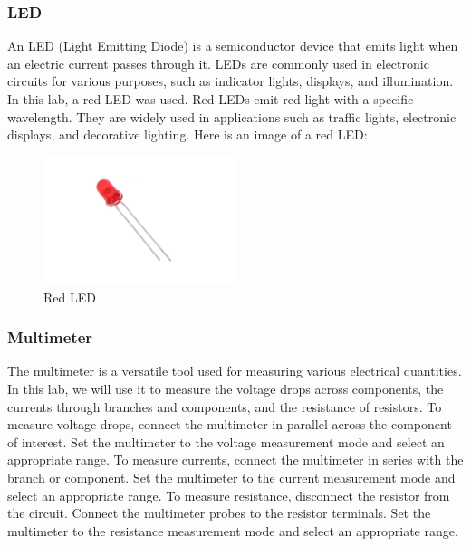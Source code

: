 \documentclass[a4paper, 10pt]{article}
\begin{document}
			\subsubsection{LED}
				An LED (Light Emitting Diode) is a semiconductor device that emits light when an electric current passes through it. LEDs are commonly used in electronic circuits for various purposes, such as indicator lights, displays, and illumination.
				In this lab, a red LED was used. Red LEDs emit red light with a specific wavelength. They are widely used in applications such as traffic lights, electronic displays, and decorative lighting.
				Here is an image of a red LED:

				\begin{figure}[h!]
					\centering
					\includegraphics[width = 0.5\textwidth]{images/LED.jpeg}
					\caption{Red LED}
					\label{fig:red_led}
				\end{figure}

			\pagebreak

			\subsubsection{Multimeter}
				The multimeter is a versatile tool used for measuring various electrical quantities. In this lab, we will use it to measure the voltage drops across components, the currents through branches and components, and the resistance of resistors.
				To measure voltage drops, connect the multimeter in parallel across the component of interest. Set the multimeter to the voltage measurement mode and select an appropriate range.
				To measure currents, connect the multimeter in series with the branch or component. Set the multimeter to the current measurement mode and select an appropriate range.
				To measure resistance, disconnect the resistor from the circuit. Connect the multimeter probes to the resistor terminals. Set the multimeter to the resistance measurement mode and select an appropriate range.
\end{document}
